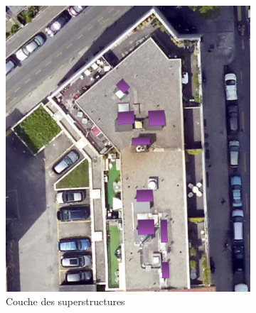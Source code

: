 \begin{figure}[H]
    \begin{subfigure}[b]{0.48\textwidth}
        \centering
        \includegraphics[width=\textwidth]{02-main/figures/ch3_piste_exploree_classification_10_resultats_image_sp.png}
        \caption{Couche des superstructures}
        \label{fig:ch3_piste_exploree_classification_10_resultats_image_sp}
    \end{subfigure}
    \hfill
    \begin{subfigure}[b]{0.475\textwidth}
        \centering

\end{subfigure}
\end{figure}
